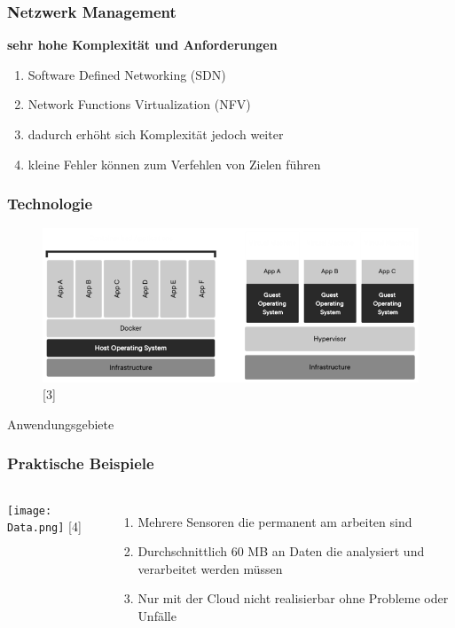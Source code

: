 \documentclass{beamer}
\begin{document}
\begin{frame}
	\frametitle{\textbf{Netzwerk Management}}
	\begin{block}{\textbf{sehr hohe Komplexität und Anforderungen}}
		\begin{enumerate}
			\item Software Defined Networking (SDN)
			\item Network Functions Virtualization (NFV)
			\item dadurch erhöht sich Komplexität jedoch weiter
			\item kleine Fehler können zum Verfehlen von Zielen führen
		\end{enumerate}
	\end{block}
\end{frame}


\begin{frame}
	\frametitle{\textbf{Technologie}}
	\begin{figure}
		\includegraphics[width=\textwidth]{Tech.png}
		\hspace*{15pt}\hbox{\scriptsize [3]}
	\end{figure}
\end{frame}


\begin{frame}
	\Large{\centerline{Anwendungsgebiete}}
\end{frame}


\begin{frame}
	\frametitle{\textbf{Praktische Beispiele}}
	\begin{columns}
		\centering
		\texttt{[image: Data.png]}
		\hspace*{15pt}\hbox{\scriptsize [4]}
		
		\begin{enumerate}
			\item Mehrere Sensoren die permanent am arbeiten sind
			\item Durchschnittlich 60 MB an Daten die analysiert und verarbeitet werden müssen 
			\item Nur mit der Cloud nicht realisierbar ohne Probleme oder Unfälle 
		\end{enumerate}
	\end{columns} 
\end{frame}
\end{document}
